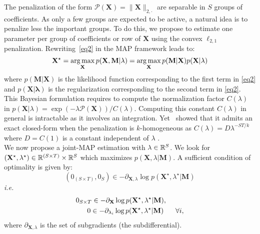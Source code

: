 The penalization of the form $\mathcal{P}(\mathbf{X})=\|\mathbf{X}\|_{2,\cdot}$ are separable in $S$ groups of coefficients.
As only a few groups are expected to be active, a natural idea is to penalize less the important groups. To do this, we propose to estimate one parameter per group of coefficients or row of $\mathbf{X}$ using the convex  $\ell_{2,1}$ penalization. Rewriting~\eqref{eq2} in the MAP framework leads to: 
\begin{equation}
\mathbf{X}^\star = \mathop{\mathrm{arg}\,\mathrm{max}}_{\mathbf{X}}
p(\mathbf{X}, \mathbf{M}|\lambda) = \mathop{\mathrm{arg}\,\mathrm{max}}_{\mathbf{X}} p(\mathbf{M}|\mathbf{X})p(\mathbf{X}|\lambda) 
\end{equation}
where $p(\mathbf{M}|\mathbf{X})$ is the likelihood function corresponding to the first term in \eqref{eq2} and $p(\mathbf{X|\lambda})$ is the regularization corresponding to the second term in \eqref{eq2}. This Bayesian formulation requires to compute the normalization factor $C(\lambda)$ in $p(\mathbf{X}|\lambda)=\exp(-\lambda\mathcal{P}(\mathbf{X}))/C(\lambda)$. Computing this constant $C(\lambda)$ in general is intractable as it involves an integration. Yet~\cite{Figueiredo} showed that it admits an exact closed-form when the penalization is $k$-homogeneous as $C(\lambda)=D\lambda^{-ST/k}$ where $D=C(1)$ is a constant independent of $\lambda$ \cite{Figueiredo}.\\
We now propose a joint-MAP estimation with $\lambda\in\mathbb{R}^S$.
We look for $(\mathbf{X}^\star, \lambda^\star) \in\mathbb{R}^{(S\times T)} \times \mathbb{R}^{S}$ which maximizes $p(\mathbf{X}, \lambda|\mathbf{M})$. A sufficient condition of optimality is given by:
\begin{equation} \label{eq7}
(0_{(S\times T)}, 0_{S}) \in -\partial_{\mathbf{X},\lambda} \log p(\mathbf{X^\star}, \lambda^\star|\mathbf{M})
\end{equation}
\vspace{-3mm}
\textit{i.e.}
\begin{equation} \label{eq8}
\begin{aligned}
0_{S\times T} \in -\partial_{\mathbf{X}} \log p(\mathbf{X^\star}, \lambda^\star|\mathbf{M}), \hspace{9mm} \\
0 \in -\partial_{\lambda_i} \log p(\mathbf{\mathbf{X}^\star}, \lambda^\star|\mathbf{M}) \hspace{6mm} \forall i,
\end{aligned}
\end{equation}
where $\partial_{\mathbf{X},\lambda}$ is the set of subgradients (the subdifferential).

